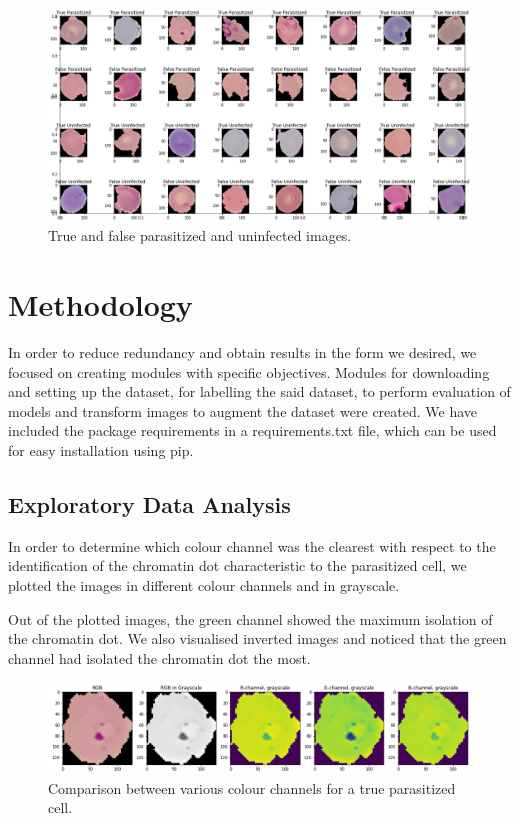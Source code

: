 \documentclass[10pt,twocolumn,letterpaper]{article}
\begin{document}
\begin{figure}[t]
   \begin{center}
      \includegraphics[width=1\linewidth]{../Plots/image_vis.png}
   \end{center}
      \caption{True and false parasitized and uninfected images.}
   \label{fig:malaria_image}
\end{figure}

\section{Methodology}

In order to reduce redundancy and obtain results in the form we desired, we focused on creating modules with specific objectives. Modules for downloading and setting up the dataset, for labelling the said dataset, to perform evaluation of models and transform images to augment the dataset were created. We have included the package requirements in a requirements.txt file, which can be used for easy installation using pip.

\subsection{Exploratory Data Analysis}
In order to determine which colour channel was the clearest with respect to the identification of the chromatin dot characteristic to the parasitized cell, we plotted the images in different colour channels and in grayscale.

Out of the plotted images, the green channel showed the maximum isolation of the chromatin dot. We also visualised inverted images and noticed that the green channel had isolated the chromatin dot the most.
\begin{figure}[t]
   \begin{center}
      \includegraphics[width=1\linewidth]{../Plots/Comparison between channels.png}
   \end{center}
      \caption{Comparison between various colour channels for a true parasitized cell.}
   \label{fig:channel_comparison}
\end{figure}
\end{document}
